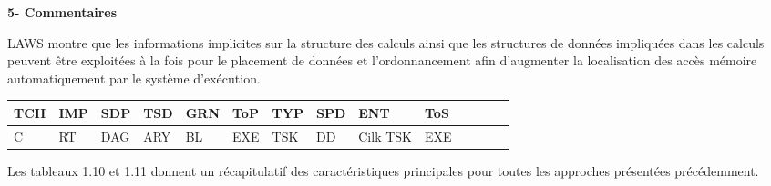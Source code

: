 \textbf{5- Commentaires}

LAWS montre que les informations implicites sur la structure des calculs ainsi que les structures de données impliquées dans les calculs peuvent être exploitées à la fois pour le placement de données et l'ordonnancement afin d'augmenter la localisation des accès mémoire automatiquement par le système d'exécution. 
%
\begin{center}%
\begin{tabular}{l *{13}{l}} 		\hline
{TCH} & {IMP} 	& {SDP} 	&  {TSD} 	& {GRN} 	& {ToP} 	& {TYP} 	& {SPD}	& {ENT} 	& {ToS} \\     		\hline
C     	& RT		& DAG		&  ARY 	& BL		& EXE		& TSK		& DD 		& Cilk TSK 	& EXE  \\     		          \hline
\end{tabular}
\end{center}
%
Les tableaux 1.10 et 1.11 donnent un récapitulatif des caractéristiques principales pour toutes les approches présentées précédemment. 
%
